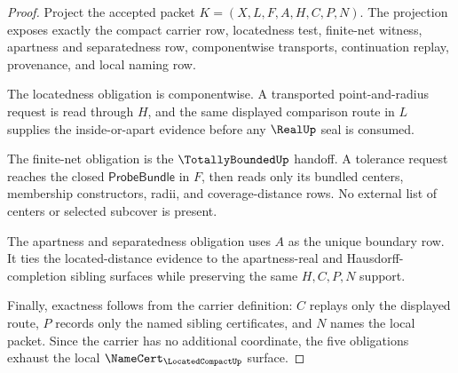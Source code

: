 \begin{proof}
Project the accepted packet $K=(X,L,F,A,H,C,P,N)$. The projection exposes exactly the compact carrier row, locatedness test, finite-net witness, apartness and separatedness row, componentwise transports, continuation replay, provenance, and local naming row.

The locatedness obligation is componentwise. A transported point-and-radius request is read through $H$, and the same displayed comparison route in $L$ supplies the inside-or-apart evidence before any $\RealUp$ seal is consumed.

The finite-net obligation is the $\TotallyBoundedUp$ handoff. A tolerance request reaches the closed $\mathsf{ProbeBundle}$ in $F$, then reads only its bundled centers, membership constructors, radii, and coverage-distance rows. No external list of centers or selected subcover is present.

The apartness and separatedness obligation uses $A$ as the unique boundary row. It ties the located-distance evidence to the apartness-real and Hausdorff-completion sibling surfaces while preserving the same $H,C,P,N$ support.

Finally, exactness follows from the carrier definition: $C$ replays only the displayed route, $P$ records only the named sibling certificates, and $N$ names the local packet. Since the carrier has no additional coordinate, the five obligations exhaust the local $\NameCert_{\LocatedCompactUp}$ surface.
\end{proof}

